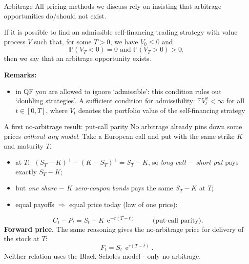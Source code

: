 \documentclass[pdf, handout]{beamer}
\newcommand{\e}{\operatorname{e}}
\begin{document}
\begin{frame}{Arbitrage}
All pricing methods we discuss rely on insisting that arbitrage opportunities do/should not
exist.

\begin{definition}
If it is possible to find an admissible self-financing trading strategy with value process $V$ such that, for some  $T>0$, we have
$V_0\leq 0$ and
\[
\mathbb{P}( V_T< 0 )=0 \text{ and }  \mathbb{P}( V_T> 0 )>0,
\]
then we say that an arbitrage opportunity exists.
\end{definition}
\textbf{Remarks:}
\begin{itemize}
\item in QF you are allowed to ignore `admissible': this condition rules out `doubling strategies'. A sufficient condition for admissibility: $\mathbb{E}V_t^2<\infty$ for all $t\in[0,T]$, 
where $V_t$ denotes the portfolio value of the self-financing strategy
\end{itemize}

\end{frame}

\begin{frame}{A first no-arbitrage result: put-call parity}
No arbitrage already pins down some prices \emph{without any model}. Take a European call and put with the same strike $K$ and maturity $T$.
\begin{itemize}
\item at $T$: $\;(S_T-K)^+-(K-S_T)^+=S_T-K$, so \emph{long call $-$ short put} pays exactly $S_T-K$;
\item but \emph{one share $-$ $K$ zero-coupon bonds} pays the same $S_T-K$ at $T$;
\item equal payoffs $\Rightarrow$ equal price today (law of one price):
\end{itemize}
\[ \boxed{\;C_t-P_t = S_t-K\,\e^{-r(T-t)}\;}\qquad\text{(put-call parity).} \]
\textbf{Forward price.} The same reasoning gives the no-arbitrage price for delivery of the stock at $T$:
\[ F_t = S_t\,\e^{r(T-t)} . \]
Neither relation uses the Black-Scholes model - only no arbitrage.
\end{frame}
\end{document}
